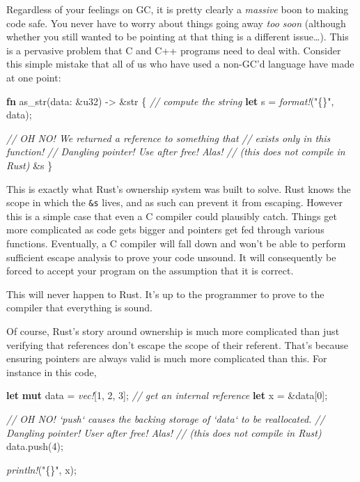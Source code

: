 \documentclass[a4paper,]{book}
\newenvironment{Shaded}{\begin{snugshade}}{\end{snugshade}}
\newcommand{\KeywordTok}[1]{\textcolor[rgb]{0.13,0.29,0.53}{\textbf{{#1}}}}
\newcommand{\DataTypeTok}[1]{\textcolor[rgb]{0.13,0.29,0.53}{{#1}}}
\newcommand{\DecValTok}[1]{\textcolor[rgb]{0.00,0.00,0.81}{{#1}}}
\newcommand{\StringTok}[1]{\textcolor[rgb]{0.31,0.60,0.02}{{#1}}}
\newcommand{\CommentTok}[1]{\textcolor[rgb]{0.56,0.35,0.01}{\textit{{#1}}}}
\newcommand{\PreprocessorTok}[1]{\textcolor[rgb]{0.56,0.35,0.01}{\textit{{#1}}}}
\newcommand{\NormalTok}[1]{{#1}}
\begin{document}
Regardless of your feelings on GC, it is pretty clearly a \emph{massive}
boon to making code safe. You never have to worry about things going
away \emph{too soon} (although whether you still wanted to be pointing
at that thing is a different issue\ldots{}). This is a pervasive problem
that C and C++ programs need to deal with. Consider this simple mistake
that all of us who have used a non-GC'd language have made at one point:

\begin{Shaded}
\begin{Highlighting}[]
\KeywordTok{fn} \NormalTok{as_str(data: &}\DataTypeTok{u32}\NormalTok{) -> &}\DataTypeTok{str} \NormalTok{\{}
    \CommentTok{// compute the string}
    \KeywordTok{let} \NormalTok{s = }\PreprocessorTok{format!}\NormalTok{(}\StringTok{"\{\}"}\NormalTok{, data);}

    \CommentTok{// OH NO! We returned a reference to something that}
    \CommentTok{// exists only in this function!}
    \CommentTok{// Dangling pointer! Use after free! Alas!}
    \CommentTok{// (this does not compile in Rust)}
    \NormalTok{&s}
\NormalTok{\}}
\end{Highlighting}
\end{Shaded}

This is exactly what Rust's ownership system was built to solve. Rust
knows the scope in which the \texttt{\&s} lives, and as such can prevent
it from escaping. However this is a simple case that even a C compiler
could plausibly catch. Things get more complicated as code gets bigger
and pointers get fed through various functions. Eventually, a C compiler
will fall down and won't be able to perform sufficient escape analysis
to prove your code unsound. It will consequently be forced to accept
your program on the assumption that it is correct.

This will never happen to Rust. It's up to the programmer to prove to
the compiler that everything is sound.

Of course, Rust's story around ownership is much more complicated than
just verifying that references don't escape the scope of their referent.
That's because ensuring pointers are always valid is much more
complicated than this. For instance in this code,

\begin{Shaded}
\begin{Highlighting}[]
\KeywordTok{let} \KeywordTok{mut} \NormalTok{data = }\PreprocessorTok{vec!}\NormalTok{[}\DecValTok{1}\NormalTok{, }\DecValTok{2}\NormalTok{, }\DecValTok{3}\NormalTok{];}
\CommentTok{// get an internal reference}
\KeywordTok{let} \NormalTok{x = &data[}\DecValTok{0}\NormalTok{];}

\CommentTok{// OH NO! `push` causes the backing storage of `data` to be reallocated.}
\CommentTok{// Dangling pointer! User after free! Alas!}
\CommentTok{// (this does not compile in Rust)}
\NormalTok{data.push(}\DecValTok{4}\NormalTok{);}

\PreprocessorTok{println!}\NormalTok{(}\StringTok{"\{\}"}\NormalTok{, x);}
\end{Highlighting}
\end{Shaded}
\end{document}
